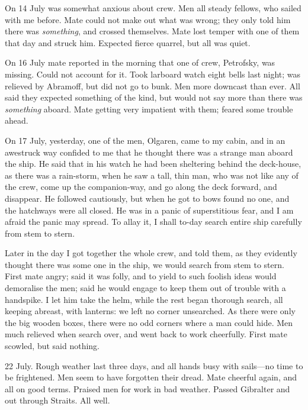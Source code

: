  

On 14 July was somewhat anxious about crew. Men all steady fellows, who sailed with me before. Mate could not make out what was wrong; they only told him there was \textit{something}, and crossed themselves. Mate lost temper with one of them that day and struck him. Expected fierce quarrel, but all was quiet.

 

On 16 July mate reported in the morning that one of crew, Petrofsky, was missing. Could not account for it. Took larboard watch eight bells last night; was relieved by Abramoff, but did not go to bunk. Men more downcast than ever. All said they expected something of the kind, but would not say more than there was \textit{something} aboard. Mate getting very impatient with them; feared some trouble ahead.

 

On 17 July, yesterday, one of the men, Olgaren, came to my cabin, and in an awestruck way confided to me that he thought there was a strange man aboard the ship. He said that in his watch he had been sheltering behind the deck-house, as there was a rain-storm, when he saw a tall, thin man, who was not like any of the crew, come up the companion-way, and go along the deck forward, and disappear. He followed cautiously, but when he got to bows found no one, and the hatchways were all closed. He was in a panic of superstitious fear, and I am afraid the panic may spread. To allay it, I shall to-day search entire ship carefully from stem to stern.

 

Later in the day I got together the whole crew, and told them, as they evidently thought there was some one in the ship, we would search from stem to stern. First mate angry; said it was folly, and to yield to such foolish ideas would demoralise the men; said he would engage to keep them out of trouble with a handspike. I let him take the helm, while the rest began thorough search, all keeping abreast, with lanterns: we left no corner unsearched. As there were only the big wooden boxes, there were no odd corners where a man could hide. Men much relieved when search over, and went back to work cheerfully. First mate scowled, but said nothing.

 
\begin{diary}{22 July.}
Rough weather last three days, and all hands busy with sails—no time to be frightened. Men seem to have forgotten their dread. Mate cheerful again, and all on good terms. Praised men for work in bad weather. Passed Gibralter and out through Straits. All well.
\end{diary}
 
